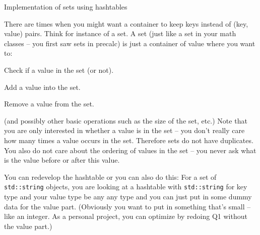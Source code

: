 Implementation of sets using hashtables

There are times when you might want a container to keep
keys instead of (key, value) pairs.
Think for instance of a set.
A set (just like a set in your math classes -- you first saw
sets in precalc) is just a container of value
where you want to:
\begin{tightlist}
  \item Check if a value in the set (or not).
  \item Add a value into the set.
  \item Remove a value from the set.
\end{tightlist}
(and possibly other basic operations such as the size of the set, etc.)
Note that you are only interested in whether a value is in the set --
you don't really care how many times a value occurs in the set.
Therefore sets do not have duplicates.
You also do not care about the ordering of values in the set --
you never ask what is the value before or after this value.


You can redevelop the hashtable or you can also do this:
For a set of \verb!std::string! objects, you are looking at a 
hashtable with \verb!std::string! for key type and your
value type be any any type and you can just put in some dummy data
for the value part.
(Obviously you want to put in something that's small -- like an
integer.
As a personal project, you can optimize by redoing Q1 without the value part.)

